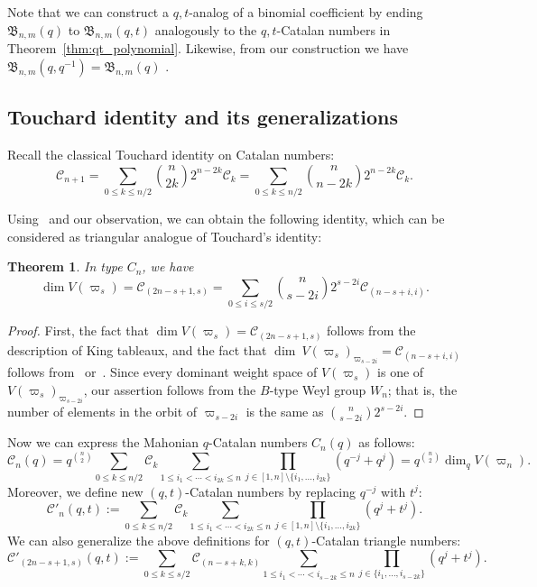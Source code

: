 \documentclass[11pt, leqno]{amsart}
\theoremstyle{plain}
\newtheorem{theorem}{Theorem}[section]
\theoremstyle{definition}
\numberwithin{equation}{section}
\newcommand{\fw}{\varpi} %
\newcommand{\seteq}{\mathbin{:=}}
\newcommand{\Cat}{\mathcal{C}} %
\newcommand{\B}{\mathfrak{B}}
\begin{document}
Note that we can construct a $q,t$-analog of a binomial coefficient by ending $\B_{n,m}(q)$ to $\B_{n,m}(q,t)$ analogously to the $q,t$-Catalan numbers in Theorem~\ref{thm:qt_polynomial}. Likewise, from our construction we have $\B_{n,m}(q,q^{-1}) = \B_{n,m}(q)$ .


\subsection{Touchard identity and its generalizations}

Recall the classical Touchard identity on Catalan numbers:
\[
\Cat_{n+1}=\sum_{0 \le k \le n/2} \binom{n}{2k} 2^{n-2k} \Cat_k
= \sum_{0 \le k \le n/2} \binom{n}{n-2k} 2^{n-2k} \Cat_k.
\]

Using~\cite[Thm.~7.3]{KLO17} and our observation, we can obtain the following
identity, which can be considered as triangular analogue of Touchard's identity:

\begin{theorem}
\label{thm:Touchard_identity}
In type $C_n$, we have
\[
\dim V(\fw_s) = \Cat_{(2n-s+1,s)} = \sum_{0 \le i \le s/2} \binom{n}{s-2i}2^{s-2i} \Cat_{(n-s+i,i)}.
\]
\end{theorem}

\begin{proof}
First, the fact that $\dim V(\fw_s) = \Cat_{(2n-s+1,s)}$ follows from
the description of King tableaux, and the fact that $\dim \ V(\fw_s)_{\fw_{s-2i}}=\Cat_{(n-s+i,i)}$
follows from~\cite[Thm.~7.3]{KLO17} or~\cite[Thm.~17.5]{FH91}.
Since every dominant weight space of $V(\fw_s)$ is one of
$V(\fw_s)_{\fw_{s-2i}}$, our assertion follows from the
$B$-type Weyl group $W_n$; that is,
the number of elements in the orbit of $\fw_{s-2i}$ is the same as
$\binom{n}{s-2i}2^{s-2i}$.
\end{proof}

Now we can express the Mahonian $q$-Catalan numbers $C_n(q)$ as follows:
\[
\Cat_n(q) = q^{\binom{n}{2}} \sum_{0 \le k \le n/2} \Cat_k \sum_{1 \le i_1 < \cdots < i_{2k} \le n}
\prod_{j \in [1,n] \setminus \{ i_1,\ldots,i_{2k}\} } (q^{-j}+q^{j}) = q^{\binom{n}{2}} \dim_q V(\fw_n).
\]
Moreover, we define new $(q,t)$-Catalan numbers by replacing $q^{-j}$ with $t^j$:
\begin{equation}\label{eq: q,t catalan number}
\Cat'_n(q,t) \seteq \sum_{0 \le k \le n/2} \Cat_k \sum_{1 \le i_1 <\cdots < i_{2k} \le n}
\prod_{j \in [1,n] \setminus \{ i_1,\ldots,i_{2k}\} } (q^{j}+t^{j}).
\end{equation}
We can also generalize the above definitions for $(q,t)$-Catalan triangle numbers:
\begin{equation}\label{eq: q,t catalan triangle}
\Cat'_{(2n-s+1,s)}(q,t) \seteq
\sum_{0 \le k \le s/2} \Cat_{(n-s+k,k)} \sum_{1 \le i_1 < \cdots < i_{s-2k} \le n}
\prod_{j \in \{ i_1,\ldots,i_{s-2k}\} } (q^{j}+t^{j}).
\end{equation}
\end{document}
